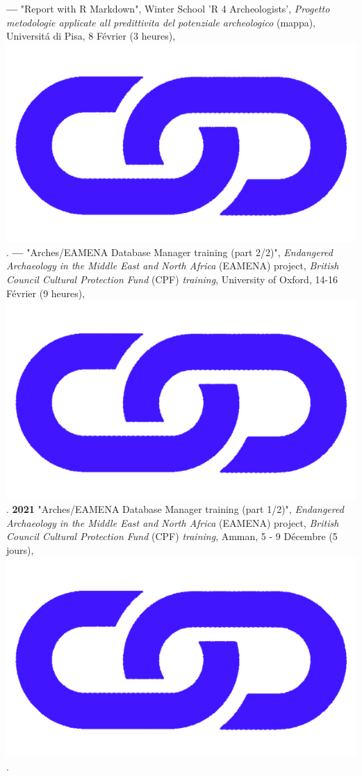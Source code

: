 \documentclass{article}
\begin{document}
\smallbreak
\textbf{--- }"Report with R Markdown", Winter School 'R 4 Archeologists', \textit{Progetto metodologie applicate all predittivita del potenziale archeologico} (mappa), Universit\'{a} di Pisa, 8 Février (3 heures), \href{https://github.com/zoometh/thomashuet/tree/main/teach/stats/r4a}{\includegraphics[scale=0.02]{link_darkblue.png}}.
\smallbreak
\textbf{--- }"Arches/EAMENA Database Manager training (part 2/2)", \textit{Endangered Archaeology in the Middle East and North Africa} (EAMENA) project, \textit{British Council Cultural Protection Fund} (CPF) \textit{training}, University of Oxford, 14-16 Février (9 heures), \href{https://github.com/eamena-oxford/eamena-arches-dev/tree/main/training#readme}{\includegraphics[scale=0.02]{link_darkblue.png}}.
\smallbreak
\textbf{2021 }"Arches/EAMENA Database Manager training (part 1/2)", \textit{Endangered Archaeology in the Middle East and North Africa} (EAMENA) project, \textit{British Council Cultural Protection Fund} (CPF) \textit{training}, Amman, 5 - 9 Décembre (5 jours), \href{https://github.com/eamena-oxford/eamena-arches-dev/tree/main/training#readme}{\includegraphics[scale=0.02]{link_darkblue.png}}.
\end{document}
